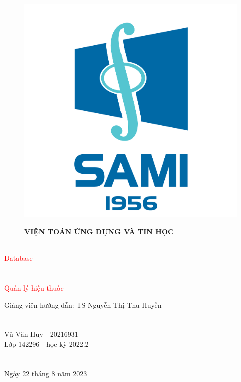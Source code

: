 \begin{titlepage}
\begin{figure}[ht]
  \centering
  \begin{minipage}[b]{0.15\textwidth}
    \includegraphics[width=\textwidth]{photo/sami.png}
  \end{minipage}
  \hspace{0.5cm}
  \begin{minipage}[b]{0.8\textwidth}
\indent \textbf{\textcolor{xanh}{\Large VIỆN TOÁN ỨNG DỤNG VÀ TIN HỌC  }}
\\\\
\indent{\Large \textcolor{blue!50}{School of Applied Mathematics and Informatics
 }}
  \end{minipage}
\end{figure}


\fontsize{40pt}{10pt}
\selectfont
\vspace{3cm}  {\textcolor{red}{Database}}
\\\\
\\
\fontsize{20pt}{10pt}
\selectfont
\indent  \textcolor{red}{Quản lý hiệu thuốc}

\vspace{3cm}
\fontsize{12pt}{5pt}
\selectfont
\noindent Giảng viên hướng dẫn: TS Nguyễn Thị Thu Huyền\\\\\\
\indent Vũ Văn Huy - 20216931\\
\indent Lớp 142296 - học kỳ 2022.2\\
\\\\
\noindent Ngày 22 tháng 8 năm 2023
\end{titlepage}